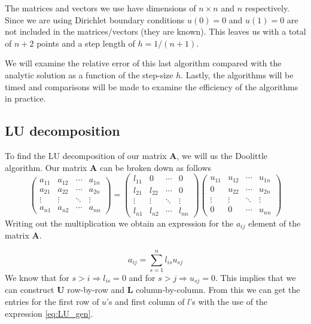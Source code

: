 \documentclass[english]{article}
\renewcommand{\vec}{\mathbf} %
\begin{document}
The matrices and vectors we use have dimensions of $n \times n$ and $n$ respectively. Since we are using Dirichlet boundary conditions $u(0) = 0$ and $u(1) = 0$ are not included in the matrices/vectors (they are known). This leaves us with a total of $n+2$ points and a step length of $h = 1/(n+1)$. 

We will examine the relative error of this last algorithm compared with the analytic solution as a function of the step-size $h$. Lastly, the algorithms will be timed and comparisons will be made to examine the efficiency of the algorithms in practice. 

\subsection{LU decomposition}
To find the LU decomposition of our matrix $\vec{A}$, we will us the Doolittle algorithm. Our matrix $\vec{A}$ can be broken down as follows
\begin{equation*}
\begin{pmatrix}
a_{11} & a_{12} & \cdots & a_{1n} \\
a_{21} & a_{22} & \cdots & a_{2n} \\
\vdots  & \vdots  & \ddots & \vdots  \\
a_{n1} & a_{n2} & \cdots & a_{nn} 
\end{pmatrix} =  \begin{pmatrix}
l_{11} & 0 & \cdots & 0 \\
l_{21} & l_{22} & \cdots & 0 \\
\vdots  & \vdots  & \ddots & \vdots  \\
l_{n1} & l_{n2} & \cdots & l_{nn} 
\end{pmatrix} \begin{pmatrix}
u_{11} & u_{12} & \cdots & u_{1n} \\
0 & u_{22} & \cdots & u_{2n} \\
\vdots  & \vdots  & \ddots & \vdots  \\
0 & 0 & \cdots & u_{nn} 
\end{pmatrix} 
\end{equation*}
Writing out the multiplication we obtain an expression for the $a_{ij}$ element of the matrix $\vec{A}$. 

\begin{equation}
    a_{ij} = \sum_{s = 1}^{n} l_{is}u_{sj}  
\label{eq:LU_gen}
\end{equation}
We know that for $s > i \Rightarrow l_{is} = 0$ and for $s > j \Rightarrow u_{sj} = 0$. This implies that we can construct $\vec{U}$ row-by-row and $\vec{L}$ column-by-column. From this we can get the entries for the first row of $u$'s and first column of $l$'s with the use of the expression \ref{eq:LU_gen}.
\end{document}
